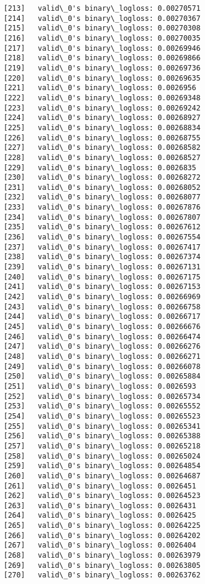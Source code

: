 \documentclass[11pt]{article}
\begin{document}
\begin{Verbatim}[commandchars=\\\{\}]
[213]	valid\_0's binary\_logloss: 0.00270571
[214]	valid\_0's binary\_logloss: 0.00270367
[215]	valid\_0's binary\_logloss: 0.00270308
[216]	valid\_0's binary\_logloss: 0.00270035
[217]	valid\_0's binary\_logloss: 0.00269946
[218]	valid\_0's binary\_logloss: 0.00269866
[219]	valid\_0's binary\_logloss: 0.00269736
[220]	valid\_0's binary\_logloss: 0.00269635
[221]	valid\_0's binary\_logloss: 0.0026956
[222]	valid\_0's binary\_logloss: 0.00269348
[223]	valid\_0's binary\_logloss: 0.00269242
[224]	valid\_0's binary\_logloss: 0.00268927
[225]	valid\_0's binary\_logloss: 0.00268834
[226]	valid\_0's binary\_logloss: 0.00268755
[227]	valid\_0's binary\_logloss: 0.00268582
[228]	valid\_0's binary\_logloss: 0.00268527
[229]	valid\_0's binary\_logloss: 0.0026835
[230]	valid\_0's binary\_logloss: 0.00268272
[231]	valid\_0's binary\_logloss: 0.00268052
[232]	valid\_0's binary\_logloss: 0.00268077
[233]	valid\_0's binary\_logloss: 0.00267876
[234]	valid\_0's binary\_logloss: 0.00267807
[235]	valid\_0's binary\_logloss: 0.00267612
[236]	valid\_0's binary\_logloss: 0.00267554
[237]	valid\_0's binary\_logloss: 0.00267417
[238]	valid\_0's binary\_logloss: 0.00267374
[239]	valid\_0's binary\_logloss: 0.00267131
[240]	valid\_0's binary\_logloss: 0.00267175
[241]	valid\_0's binary\_logloss: 0.00267153
[242]	valid\_0's binary\_logloss: 0.00266969
[243]	valid\_0's binary\_logloss: 0.00266758
[244]	valid\_0's binary\_logloss: 0.00266717
[245]	valid\_0's binary\_logloss: 0.00266676
[246]	valid\_0's binary\_logloss: 0.00266474
[247]	valid\_0's binary\_logloss: 0.00266276
[248]	valid\_0's binary\_logloss: 0.00266271
[249]	valid\_0's binary\_logloss: 0.00266078
[250]	valid\_0's binary\_logloss: 0.00265884
[251]	valid\_0's binary\_logloss: 0.0026593
[252]	valid\_0's binary\_logloss: 0.00265734
[253]	valid\_0's binary\_logloss: 0.00265552
[254]	valid\_0's binary\_logloss: 0.00265523
[255]	valid\_0's binary\_logloss: 0.00265341
[256]	valid\_0's binary\_logloss: 0.00265388
[257]	valid\_0's binary\_logloss: 0.00265218
[258]	valid\_0's binary\_logloss: 0.00265024
[259]	valid\_0's binary\_logloss: 0.00264854
[260]	valid\_0's binary\_logloss: 0.00264687
[261]	valid\_0's binary\_logloss: 0.0026451
[262]	valid\_0's binary\_logloss: 0.00264523
[263]	valid\_0's binary\_logloss: 0.0026431
[264]	valid\_0's binary\_logloss: 0.0026425
[265]	valid\_0's binary\_logloss: 0.00264225
[266]	valid\_0's binary\_logloss: 0.00264202
[267]	valid\_0's binary\_logloss: 0.0026404
[268]	valid\_0's binary\_logloss: 0.00263979
[269]	valid\_0's binary\_logloss: 0.00263805
[270]	valid\_0's binary\_logloss: 0.00263762

\end{Verbatim}
\end{document}
